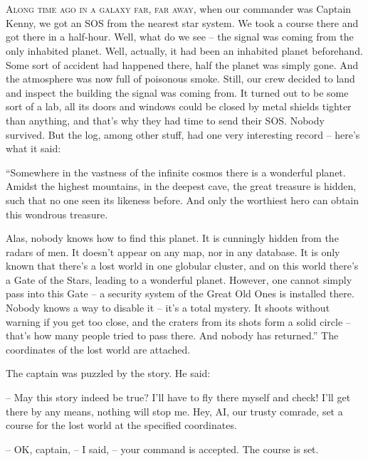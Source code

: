 \documentclass[ebook,twoside,final,openright]{memoir}
\begin{document}
\chapter{}
\par
\lettrine{A}{long time ago in a galaxy far, far away,} when our commander was Captain Kenny, we got an SOS from the nearest star system. We took a course there and got there in a half-hour. Well, what do we see – the signal was coming from the only inhabited planet. Well, actually, it had been an inhabited planet beforehand. Some sort of accident had happened there, half the planet was simply gone. And the atmosphere was now full of poisonous smoke. Still, our crew decided to land and inspect the building the signal was coming from. It turned out to be some sort of a lab, all its doors and windows could be closed by metal shields tighter than anything, and that's why they had time to send their SOS. Nobody survived. But the log, among other stuff, had one very interesting record – here’s what it said:\par
\par
“Somewhere in the vastness of the infinite cosmos there is a wonderful planet. Amidst the highest mountains, in the deepest cave, the great treasure is hidden, such that no one seen its likeness before. And only the worthiest hero can obtain this wondrous treasure. \par
Alas, nobody knows how to find this planet. It is cunningly hidden from the radars of men. It doesn’t appear on any map, nor in any database. It is only known that there’s a lost world in one globular cluster, and on this world there’s a Gate of the Stars, leading to a wonderful planet. However, one cannot simply pass into this Gate – a security system of the Great Old Ones is installed there. Nobody knows a way to disable it – it’s a total mystery. It shoots without warning if you get too close, and the craters from its shots form a solid circle – that's how many people tried to pass there. And nobody has returned.” The coordinates of the lost world are attached.\par
\par
The captain was puzzled by the story. He said:\par
– May this story indeed be true? I’ll have to fly there myself and check! I'll get there by any means, nothing will stop me. Hey, AI, our trusty comrade, set a course for the lost world at the specified coordinates.\par
– OK, captain, – I said, – your command is accepted. The course is set.\par
\end{document}
